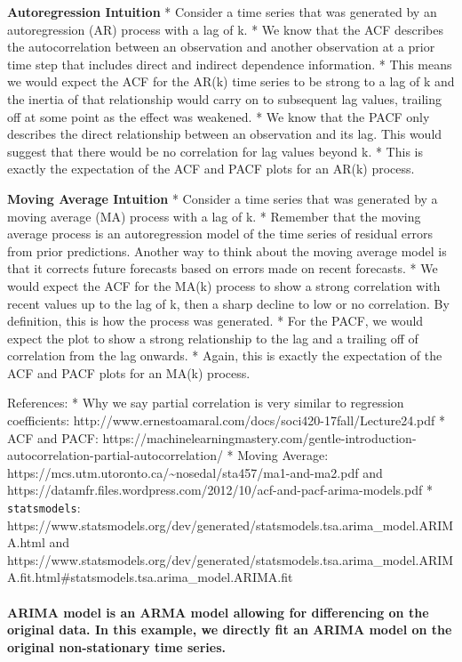 \documentclass[11pt]{article}
\begin{document}
\textbf{Autoregression Intuition} * Consider a time series that was
generated by an autoregression (AR) process with a lag of k. * We know
that the ACF describes the autocorrelation between an observation and
another observation at a prior time step that includes direct and
indirect dependence information. * This means we would expect the ACF
for the AR(k) time series to be strong to a lag of k and the inertia of
that relationship would carry on to subsequent lag values, trailing off
at some point as the effect was weakened. * We know that the PACF only
describes the direct relationship between an observation and its lag.
This would suggest that there would be no correlation for lag values
beyond k. * This is exactly the expectation of the ACF and PACF plots
for an AR(k) process.

\textbf{Moving Average Intuition} * Consider a time series that was
generated by a moving average (MA) process with a lag of k. * Remember
that the moving average process is an autoregression model of the time
series of residual errors from prior predictions. Another way to think
about the moving average model is that it corrects future forecasts
based on errors made on recent forecasts. * We would expect the ACF for
the MA(k) process to show a strong correlation with recent values up to
the lag of k, then a sharp decline to low or no correlation. By
definition, this is how the process was generated. * For the PACF, we
would expect the plot to show a strong relationship to the lag and a
trailing off of correlation from the lag onwards. * Again, this is
exactly the expectation of the ACF and PACF plots for an MA(k) process.

References: * Why we say partial correlation is very similar to
regression coefficients:
http://www.ernestoamaral.com/docs/soci420-17fall/Lecture24.pdf * ACF and
PACF:
https://machinelearningmastery.com/gentle-introduction-autocorrelation-partial-autocorrelation/
* Moving Average:
https://mcs.utm.utoronto.ca/\textasciitilde{}nosedal/sta457/ma1-and-ma2.pdf
and
https://datamfr.files.wordpress.com/2012/10/acf-and-pacf-arima-models.pdf
* \texttt{statsmodels}:
https://www.statsmodels.org/dev/generated/statsmodels.tsa.arima\_model.ARIMA.html
and
https://www.statsmodels.org/dev/generated/statsmodels.tsa.arima\_model.ARIMA.fit.html\#statsmodels.tsa.arima\_model.ARIMA.fit

    \paragraph{ARIMA model is an ARMA model allowing for differencing on the
original data. In this example, we directly fit an ARIMA model on the
original non-stationary time
series.}\label{arima-model-is-an-arma-model-allowing-for-differencing-on-the-original-data.-in-this-example-we-directly-fit-an-arima-model-on-the-original-non-stationary-time-series.}
\end{document}
